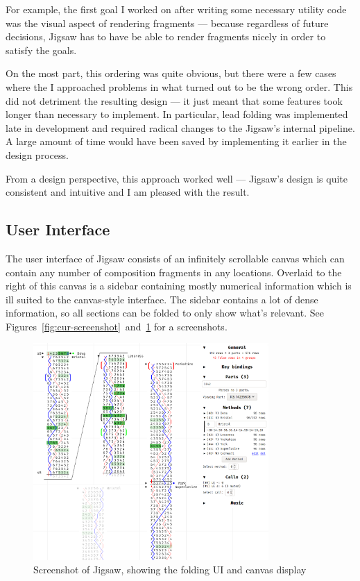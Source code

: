 \documentclass[12pt]{article}
\begin{document}
For example, the first goal I worked on after writing some necessary utility code was the visual
aspect of rendering fragments --- because regardless of future decisions, Jigsaw has to have be able
to render fragments nicely in order to satisfy the goals.

On the most part, this ordering was quite obvious, but there were a few cases where the I approached
problems in what turned out to be the wrong order.  This did not detriment the resulting design ---
it just meant that some features took longer than necessary to implement.  In particular, lead
folding was implemented late in development and required radical changes to the Jigsaw's internal
pipeline.  A large amount of time would have been saved by implementing it earlier in the design
process.  

From a design perspective, this approach worked well --- Jigsaw's design is quite consistent and
intuitive and I am pleased with the result.

\subsection{User Interface}

The user interface of Jigsaw consists of an infinitely scrollable canvas which can contain any
number of composition fragments in any locations.  Overlaid to the right of this canvas is a sidebar
containing mostly numerical information which is ill suited to the canvas-style interface.  The
sidebar contains a lot of dense information, so all sections can be folded to only show what's
relevant.  See Figures~\ref{fig:cur-screenshot}~and~\ref{fig:cur-screenshot-2} for a screenshots.

\begin{figure}
    \centering
    \includegraphics[width=0.8\textwidth]{current-screenshot-w-mute}
    \caption{Screenshot of Jigsaw, showing the folding UI and canvas
    display}\label{fig:cur-screenshot-2}
\end{figure}
\end{document}
